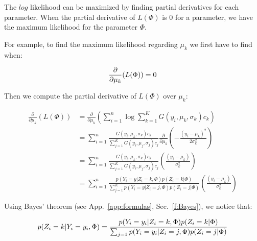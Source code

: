 The $log$ likelihood can be maximized by finding partial derivatives for each parameter. When the partial derivative of $L(\Phi)$ is $0$ for a parameter, we have the maximum likelihood for the parameter $\Phi$.
\par
For example, to find the maximum likelihood regarding $\mu_k$ we first have to find when:

  \begin{equation*}\label{PD}
  \frac{\partial}{\partial\mu_k}(L(\Phi))=0\\
  \end{equation*}

\par
Then we compute the partial derivative of $L(\Phi)$ over $\mu_k$:

  \begin{align}\label{partialDerivative}
  \frac{\partial}{\partial\mu_k}(L(\Phi)) &= \frac{\partial}{\partial\mu_k}( \sum_{i=1}^n \operatorname*{log} \sum_{k=1}^K G(y_i,\mu_k,\sigma_k)c_k\nonumber)  \\
                                          &= \sum_{i=1}^n \frac{G(y_i,\mu_k,\sigma_k)c_k}{\sum_{j=1}^K G(y_i,\mu_j,\sigma_j)c_j}\frac{\partial}{\partial\mu_k}  (-\frac{(y_i-\mu_k)^2}{2\sigma_k^2}) \nonumber \\
                                          &= \sum_{i=1}^n \frac{G(y_i,\mu_k,\sigma_k)c_k}{\sum_{j=1}^K G(y_i,\mu_j,\sigma_j)c_j}(\frac{(y_i-\mu_k)}{\sigma_k^2}) \nonumber \\
                                          &= \sum_{i=1}^n \frac{p(Y_i=y|Z_i=k,\Phi)p(Z_i=k|\Phi)}{\sum_{j=1}^K p(Y_i=y|Z_i=j,\Phi)p(Z_i=j|\Phi)}(\frac{(y_i-\mu_k)} {\sigma_k^2})
  \end{align}

Using Bayes' theorem (see App.~\ref{app:formulas}, Sec.~\ref{f:Bayes}), we notice that:

  \begin{equation}\label{BF}
  p(Z_i=k|Y_i=y_i,\Phi)= \frac{p(Y_i=y_i|Z_i=k,\Phi)p(Z_i=k|\Phi)}{\sum_{j=1} p(Y_i=y_i|Z_i=j,\Phi)p(Z_i=j|\Phi)}\\
  \end{equation}

